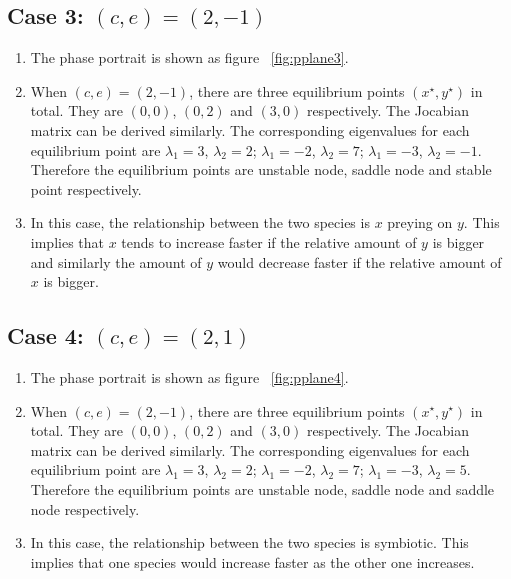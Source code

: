 \subsection*{Case 3: $(c,e)=(2,-1)$}
\begin{enumerate}
\item The phase portrait is shown as figure ~\ref{fig:pplane3}.
\item When $(c,e)=(2,-1)$, there are three equilibrium points $(x^\star,y^\star)$ in total. They are $(0,0)$, $(0,2)$ and $(3,0)$ respectively. The Jocabian matrix can be derived similarly. The corresponding eigenvalues for each equilibrium point are $\lambda_{1} = 3$, $\lambda_{2} = 2$; $\lambda_1 = -2$, $\lambda_2 = 7$; $\lambda_1 = -3$, $\lambda_2 = -1$. Therefore the equilibrium points are unstable node, saddle node and stable point respectively. 
\item In this case, the relationship between the two species is $x$ preying on $y$. This implies that $x$ tends to increase faster if the relative amount of $y$ is bigger and similarly the amount of $y$ would decrease faster if the relative amount of $x$ is bigger.   
\end{enumerate}

\subsection*{Case 4: $(c,e)=(2,1)$}
\begin{enumerate}
\item The phase portrait is shown as figure ~\ref{fig:pplane4}. 
\item When $(c,e)=(2,-1)$, there are three equilibrium points $(x^\star,y^\star)$ in total. They are $(0,0)$, $(0,2)$ and $(3,0)$ respectively. The Jocabian matrix can be derived similarly. The corresponding eigenvalues for each equilibrium point are $\lambda_{1} = 3$, $\lambda_{2} = 2$; $\lambda_1 = -2$, $\lambda_2 = 7$; $\lambda_1 = -3$, $\lambda_2 = 5$. Therefore the equilibrium points are unstable node, saddle node and saddle node respectively. 
\item In this case, the relationship between the two species is symbiotic. This implies that one species would increase faster as the other one increases. 
\end{enumerate}